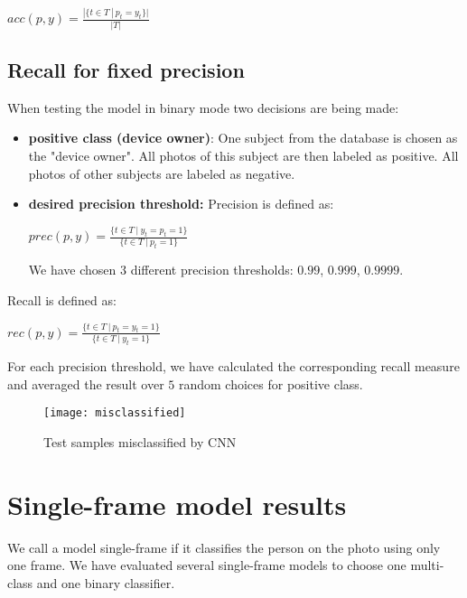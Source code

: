         \begin{center}
        $acc(p, y) = \frac{|\{t \in T\ |\ p_t = y_t\}|}{|T|}$
        \end{center}

        \subsection*{Recall for fixed precision}

        When testing the model in binary mode two decisions are being made:
        \begin{itemize}
            \item \textbf{positive class (device owner)}: One subject from the
            database is chosen as the "device owner". All photos of this subject
            are then labeled as positive. All photos of other subjects are
            labeled as negative.
            \item \textbf{desired precision threshold:}
            Precision is defined as:
            \begin{center}
            $prec(p, y) = \frac{\{t \in T\ |\ y_t = p_t = 1\}}{\{t \in T\ |\ p_t = 1\}}$
            \end{center}
            We have chosen $3$ different precision thresholds: $0.99$, $0.999$, $0.9999$.
        \end{itemize}
        Recall is defined as:
        \begin{center}
        $rec(p, y) = \frac{\{t \in T\ |\ p_t = y_t = 1\}}{\{t \in T\ |\ y_t = 1\}}$
        \end{center}
        For each precision threshold, we have calculated the corresponding recall measure and
        averaged the result over $5$ random choices for positive class.

    \begin{figure}[H]
    \caption{Test samples misclassified by CNN}
    \centering
    \texttt{[image: misclassified]}
    \end{figure}


    \section{Single-frame model results}
        We call a model single-frame if it classifies the person on the photo
        using only one frame. We have evaluated several single-frame models to
        choose one multi-class and one binary classifier.
